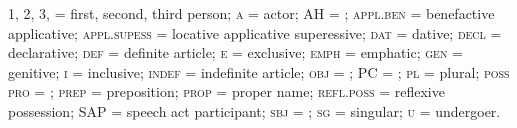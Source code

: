 \documentclass[output=paper]{LSP/langsci}
\begin{document}
1, 2, 3, = first, second, third person; \textsc{a} = actor; AH = ; \textsc{appl.ben} = benefactive applicative; \textsc{appl.supess} = locative applicative superessive; \textsc{dat} = dative; \textsc{decl} = declarative; \textsc{def} = definite article; \textsc{e} = exclusive; \textsc{emph} = emphatic; \textsc{gen} = genitive; \textsc{i} = inclusive; \textsc{indef} = indefinite article; \textsc{obj} = ; PC = ; \textsc{pl} = plural; \textsc{poss pro} = ; \textsc{prep} = preposition; \textsc{prop} = proper name; \textsc{refl.poss} = reflexive possession; SAP = speech act participant; \textsc{sbj} = ; \textsc{sg} = singular; \textsc{u} = undergoer.
 \printbibliography[heading=subbibliography,notkeyword=this]
 
\end{document}
